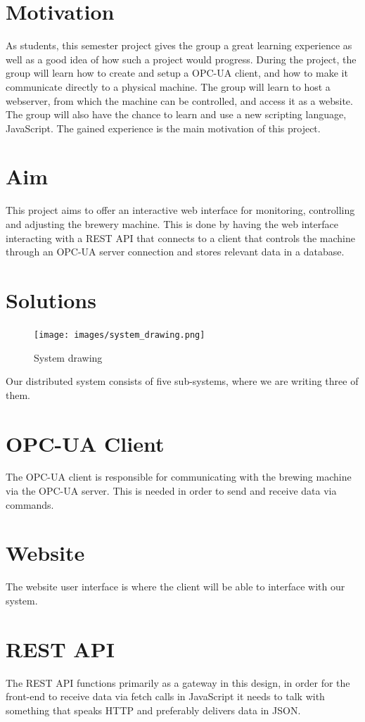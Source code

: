 \section{Motivation}
As students,
this semester project gives the group a great learning experience as well as a good idea of how such a project would progress.
During the project, the group will learn how to create and setup a OPC-UA client,
and how to make it communicate directly to a physical machine.
The group will learn to host a webserver, from which the machine can be controlled,
and access it as a website.
The group will also have the chance to learn and use a new scripting language, JavaScript.
The gained experience is the main motivation of this project.

\section{Aim}
This project aims to offer an interactive web interface for monitoring,
controlling and adjusting the brewery machine. This is done by having the web
interface interacting with a REST API that connects to a client that controls
the machine through an OPC-UA server connection and stores relevant data in a 
database.

\section{Solutions}
\begin{figure}[h]
\centering 
\texttt{[image: images/system\_drawing.png]}
\label{figure:system_drawing}
\caption{System drawing} 
\end{figure}

Our distributed system consists of five sub-systems, where we are writing three
of them.

\section{OPC-UA Client}
The OPC-UA client is responsible for communicating with the brewing machine via
the OPC-UA server. This is needed in order to send and receive data via
commands.

\section{Website}
The website user interface is where the client will be able to interface with
our system.

\section{REST API}
The REST API functions primarily as a gateway in this design, in order for the
front-end to receive data via fetch calls in JavaScript it needs to talk with
something that speaks HTTP and preferably delivers data in JSON.

